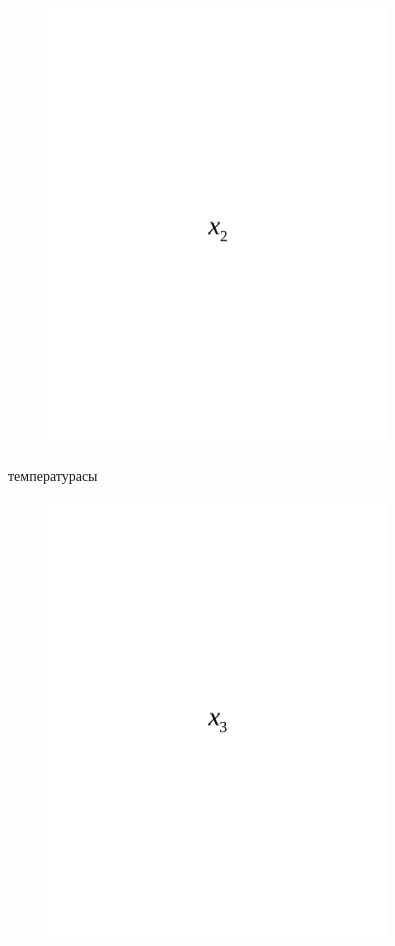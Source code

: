 \begin{figure}[H]
	\centering
	\includegraphics[width=0.8\textwidth]{media/ict/image88}
	\caption*{}
\end{figure}

температурасы
\begin{figure}[H]
	\centering
	\includegraphics[width=0.8\textwidth]{media/ict/image89}
	\caption*{}
\end{figure}

